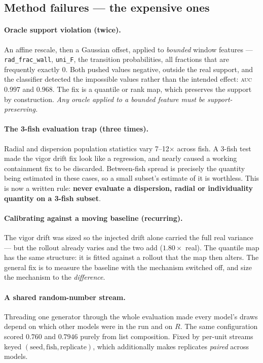 \documentclass[11pt,a4paper]{article}
\newcommand{\auc}{\textsc{auc}}
\newcommand{\code}[1]{\texttt{\small #1}}
\begin{document}
\subsection{Method failures --- the expensive ones}

\paragraph{Oracle support violation (twice).}
An affine rescale, then a Gaussian offset, applied to \emph{bounded} window features ---
\code{rad\_frac\_wall}, \code{uni\_F}, the transition probabilities, all fractions that are
frequently exactly $0$. Both pushed values negative, outside the real support, and the
classifier detected the impossible values rather than the intended effect: \auc\ $0.997$
and $0.968$. The fix is a quantile or rank map, which preserves the support by
construction. \emph{Any oracle applied to a bounded feature must be support-preserving.}

\paragraph{The 3-fish evaluation trap (three times).}
Radial and dispersion population statistics vary 7--12$\times$ across fish. A 3-fish test
made the vigor drift fix look like a regression, and nearly caused a working containment
fix to be discarded. Between-fish spread is precisely the quantity being estimated in
these cases, so a small subset's estimate of it is worthless. This is now a written rule:
\textbf{never evaluate a dispersion, radial or individuality quantity on a 3-fish subset}.

\paragraph{Calibrating against a moving baseline (recurring).}
The vigor drift was sized so the injected drift alone carried the full real
variance --- but the rollout already varies and the two add ($1.80\times$ real). The
quantile map has the same structure: it is fitted against a rollout that the map then
alters. The general fix is to measure the baseline with the mechanism switched off, and
size the mechanism to the \emph{difference}.

\paragraph{A shared random-number stream.}
Threading one generator through the whole evaluation made every model's draws depend on
which other models were in the run and on $R$. The same configuration scored $0.760$ and
$0.7946$ purely from list composition. Fixed by per-unit streams keyed
$(\text{seed}, \text{fish}, \text{replicate})$, which additionally makes replicates
\emph{paired} across models.
\end{document}
